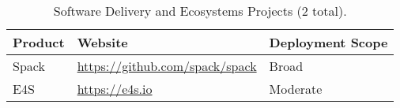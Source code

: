 \begin{table}
\begin{tabular}{|l|l|l|}\hline
		\rowcolor{LightCyan}
	\textbf{Product} & \textbf{Website} & \textbf{Deployment Scope}\\\hline
	Spack & \url{https://github.com/spack/spack} & Broad\\\hline
	E4S & \url{https://e4s.io} & Moderate\\\hline

\end{tabular}
\caption{\label{table:eco-products} Software Delivery and Ecosystems Projects (2 total).}
\end{table}
